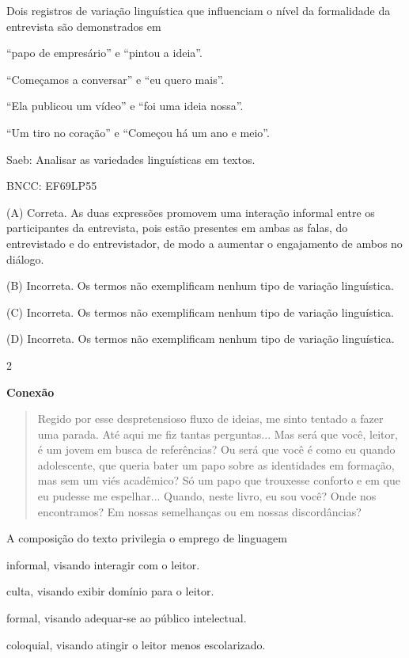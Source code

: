 Dois registros de variação linguística que influenciam o nível da
formalidade da entrevista são demonstrados em

\begin{escolha}
\item ``papo de empresário'' e ``pintou a ideia''.

\item ``Começamos a conversar'' e ``eu quero mais''.

\item ``Ela publicou um vídeo'' e ``foi uma ideia nossa''.

\item ``Um tiro no coração'' e ``Começou há um ano e meio''.
\end{escolha}

Saeb: Analisar as variedades linguísticas em textos.

BNCC: EF69LP55

(A) Correta. As duas expressões promovem uma interação informal entre os
participantes da entrevista, pois estão presentes em ambas as falas, do
entrevistado e do entrevistador, de modo a aumentar o engajamento de
ambos no diálogo.

(B) Incorreta. Os termos não exemplificam nenhum tipo de variação
linguística.

(C) Incorreta. Os termos não exemplificam nenhum tipo de variação
linguística.

(D) Incorreta. Os termos não exemplificam nenhum tipo de variação
linguística.

\num{2}

\textbf{Conexão}

\begin{quote}
Regido por esse despretensioso fluxo de ideias, me sinto tentado a fazer
uma parada. Até aqui me fiz tantas perguntas... Mas será que você,
leitor, é um jovem em busca de referências? Ou será que você é como eu
quando adolescente, que queria bater um papo sobre as identidades em
formação, mas sem um viés acadêmico? Só um papo que trouxesse conforto e
em que eu pudesse me espelhar... Quando, neste livro, eu sou você? Onde
nos encontramos? Em nossas semelhanças ou em nossas discordâncias?
\end{quote}

A composição do texto privilegia o emprego de linguagem

\begin{escolha}
\item informal, visando interagir com o leitor.

\item culta, visando exibir domínio para o leitor.

\item formal, visando adequar-se ao público intelectual.

\item coloquial, visando atingir o leitor menos escolarizado.
\end{escolha}

